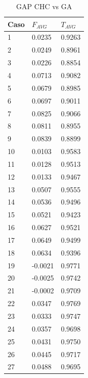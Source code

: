 \documentclass[journal]{IEEEtran}
\begin{document}
\label{tabla:gap}
\begin{table}
\begin{center}
    \begin{tabular}{| l | l | l|}
    \hline
    \textbf{Caso} & \textbf{$F_{AVG}$} & \textbf{$T_{AVG}$} \\ \hline
    1	& 0.0235	& 0.9263 \\ \hline
    2	& 0.0249	& 0.8961 \\ \hline
    3	& 0.0226	& 0.8854 \\ \hline
    4	& 0.0713	& 0.9082 \\ \hline
    5	& 0.0679	& 0.8985 \\ \hline
    6	& 0.0697	& 0.9011 \\ \hline
    7	& 0.0825	& 0.9066 \\ \hline
    8	& 0.0811	& 0.8955 \\ \hline
    9	& 0.0839	& 0.8899 \\ \hline
    10	& 0.0103	& 0.9583 \\ \hline
    11	& 0.0128	& 0.9513 \\ \hline
    12	& 0.0133	& 0.9467 \\ \hline
    13	& 0.0507	& 0.9555 \\ \hline
    14	& 0.0536	& 0.9496 \\ \hline
    15	& 0.0521	& 0.9423 \\ \hline
    16	& 0.0627	& 0.9521 \\ \hline
    17	& 0.0649	& 0.9499 \\ \hline
    18	& 0.0634	& 0.9396 \\ \hline
    19	& -0.0021	& 0.9771 \\ \hline
    20	& -0.0025	& 0.9742 \\ \hline
    21	& -0.0002	& 0.9709 \\ \hline
    22	& 0.0347	& 0.9769 \\ \hline
    23	& 0.0333	& 0.9747 \\ \hline
    24	& 0.0357	& 0.9698 \\ \hline
    25	& 0.0431	& 0.9750 \\ \hline
    26	& 0.0445	& 0.9717 \\ \hline
    27	& 0.0488	& 0.9695 \\ \hline
     
    \end{tabular}
\end{center}
\caption{GAP CHC vs GA}
\end{table}
\end{document}
